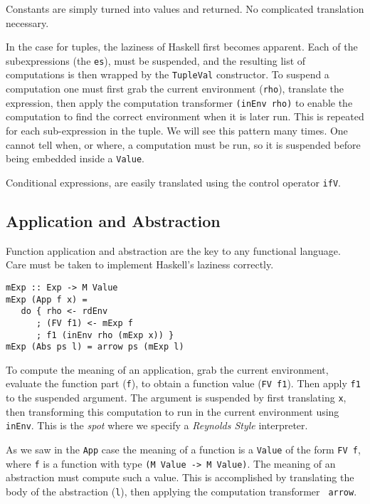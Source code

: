 \documentclass{entcs} \usepackage{entcsmacro}
\begin{document}
Constants are simply turned into values and returned. No complicated translation
necessary.

In the case for tuples, the laziness of Haskell first becomes apparent. Each of the
subexpressions (the {\tt es}), must be suspended, and the resulting list of
computations is then wrapped by the {\tt TupleVal} constructor. To suspend a
computation one must first grab the current environment ({\tt rho}), translate the
expression, then apply the computation transformer {\tt (inEnv rho)} to enable the
computation to find the correct environment when it is later run. This is repeated
for each sub-expression in the tuple. We will see this pattern many times. One
cannot tell when, or where, a computation must be run, so it is suspended before
being embedded inside a {\tt Value}.
 
Conditional expressions, are easily translated using the control operator {\tt ifV}.

\subsection{Application and Abstraction}

Function application and abstraction are the key to any functional
language. Care must 
be taken to implement Haskell's laziness correctly.

{\small\label{CBNapplication}
\begin{verbatim}
mExp :: Exp -> M Value
mExp (App f x) =
   do { rho <- rdEnv
      ; (FV f1) <- mExp f
      ; f1 (inEnv rho (mExp x)) }
mExp (Abs ps l) = arrow ps (mExp l)
\end{verbatim}
}

To compute the meaning of an application, grab the current environment, evaluate
the function part ({\tt f}), to obtain a function value ({\tt FV f1}). Then apply
{\tt f1} to the suspended argument. The argument is suspended by first translating
{\tt x}, then transforming this computation to run in the current environment using
{\tt inEnv}. This is the {\em spot} where we specify a {\em Reynolds Style}
interpreter\cite{Reynolds}.

As we saw in the {\tt App} case the meaning of a function is a {\tt Value} of the form
{\tt FV f}, where {\tt f} is a function with type {\tt (M Value -> M Value)}. The meaning
of an abstraction must compute such a value. This is accomplished by translating the
body of the abstraction ({\tt l}), then applying the computation transformer {\tt
arrow}.
\end{document}
